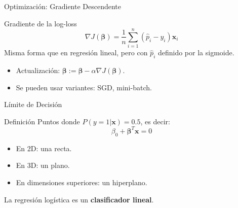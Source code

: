 \documentclass[aspectratio=169, 10pt, xcolor=table]{beamer}
\begin{document}
\begin{frame}{Optimización: Gradiente Descendente}
    \begin{block}{Gradiente de la log-loss}
        \[
        \nabla J(\boldsymbol{\beta}) = \frac{1}{n} \sum_{i=1}^n (\hat{p}_i - y_i) \mathbf{x}_i
        \]
        Misma forma que en regresión lineal, pero con $\hat{p}_i$ definido por la sigmoide.
    \end{block}
    \begin{itemize}
        \item Actualización: $\boldsymbol{\beta} := \boldsymbol{\beta} - \alpha \nabla J(\boldsymbol{\beta})$.
        \item Se pueden usar variantes: SGD, mini-batch.
    \end{itemize}
\end{frame}

\begin{frame}{Límite de Decisión}
    \begin{block}{Definición}
        Puntos donde $P(y=1|\mathbf{x}) = 0.5$, es decir:
        \[
        \beta_0 + \boldsymbol{\beta}^T \mathbf{x} = 0
        \]
        \begin{itemize}
            \item En 2D: una recta.
            \item En 3D: un plano.
            \item En dimensiones superiores: un hiperplano.
        \end{itemize}
    \end{block}
    \begin{exampleblock}
        La regresión logística es un \textbf{clasificador lineal}.
    \end{exampleblock}
\end{frame}
\end{document}

